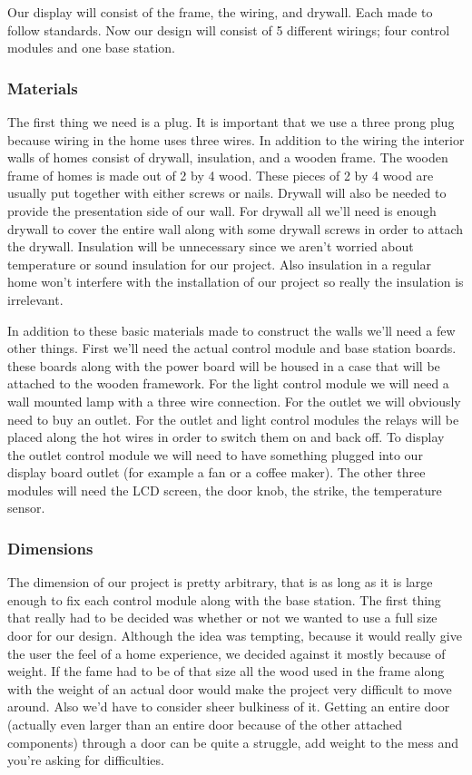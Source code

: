 Our display will consist of the frame, the wiring, and drywall.
Each made to follow standards. Now our design will consist of 5 different
wirings; four control modules and one base station.

\subsubsection{Materials}
The first thing we need is a plug. It is important that we use a three prong
plug because wiring in the home uses three wires. In addition to the wiring the
interior walls of homes consist of drywall, insulation, and a wooden frame. The
wooden frame of homes is made out of 2 by 4 wood. These pieces of 2 by 4 wood
are usually put together with either screws or nails. Drywall will also be
needed to provide the presentation side of our wall. For drywall all we{}'ll
need is enough drywall to cover the entire wall along with some drywall screws
in order to attach the drywall. Insulation will be unnecessary since we
aren{}'t worried about temperature or sound insulation for our project. Also
insulation in a regular home won{}'t interfere with the installation of our
project so really the insulation is irrelevant.

In addition to these basic materials made to construct the walls
we{}'ll need a few other things. First we{}'ll need the actual control module
and base station boards. these boards along with the power board will be housed
in a case that will be attached to the wooden framework. For the light control
module we will need a wall mounted lamp with a three wire connection. For the
outlet we will obviously need to buy an outlet. For the outlet and light
control modules the relays will be placed along the hot wires in order to
switch them on and back off. To display the outlet control module we will need
to have something plugged into our display board outlet (for example a fan or a
coffee maker). The other three modules will need the LCD screen, the door knob,
the strike, the temperature sensor.


\subsubsection{Dimensions} The dimension of our project is pretty arbitrary,
that is as long as it is large enough to fix each control module along with the
base station. The first thing that really had to be decided was whether or not
we wanted to use a full size door for our design. Although the idea was
tempting, because it would really give the user the feel of a home experience,
we decided against it mostly because of weight. If the fame had to be of that
size all the wood used in the frame along with the weight of an actual door
would make the project very difficult to move around. Also we{}'d have to
consider sheer bulkiness of it. Getting an entire door (actually even larger
than an entire door because of the other attached components) through a door
can be quite a struggle, add weight to the mess and you{}'re asking for
difficulties.

